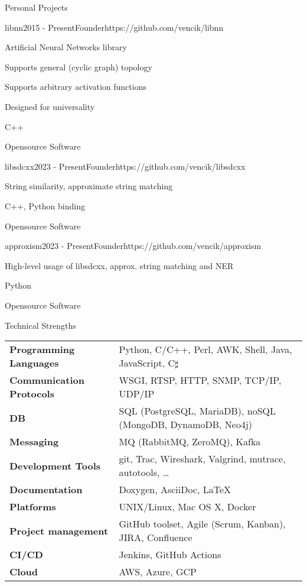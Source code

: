 \documentclass{resume} %
\begin{document}
\begin{rSection}{Personal Projects}
\begin{rSubsection}{libnn}{2015 - Present}{Founder}{https://github.com/vencik/libnn}
\item Artificial Neural Networks library
\item Supports general (cyclic graph) topology
\item Supports arbitrary activation functions
\item Designed for universality
\item C++
\item Opensource Software
\end{rSubsection}

\begin{rSubsection}{libsdcxx}{2023 - Present}{Founder}{https://github.com/vencik/libsdcxx}
\item String similarity, approximate string matching
\item C++, Python binding
\item Opensource Software
\end{rSubsection}

\begin{rSubsection}{approxism}{2023 - Present}{Founder}{https://github.com/vencik/approxism}
\item High-level usage of libsdcxx, approx. string matching and NER
\item Python
\item Opensource Software
\end{rSubsection}

\end{rSection}


\begin{rSection}{Technical Strengths}

\begin{tabular}{ @{} >{\bfseries}l @{\hspace{6ex}} l }
Programming Languages & Python, C/C++, Perl, AWK, Shell, Java, JavaScript, C$\sharp$ \\
Communication Protocols & WSGI, RTSP, HTTP, SNMP, TCP/IP, UDP/IP \\
DB & SQL (PostgreSQL, MariaDB), noSQL (MongoDB, DynamoDB, Neo4j) \\
Messaging & MQ (RabbitMQ, ZeroMQ), Kafka \\
Development Tools & git, Trac, Wireshark, Valgrind, mutrace, autotools, \dots \\
Documentation & Doxygen, AsciiDoc, \LaTeX \\
Platforms & UNIX/Linux, Mac OS X, Docker \\
Project management & GitHub toolset, Agile (Scrum, Kanban), JIRA, Confluence \\
CI/CD & Jenkins, GitHub Actions \\
Cloud & AWS, Azure, GCP
\end{tabular}

\end{rSection}
\end{document}
